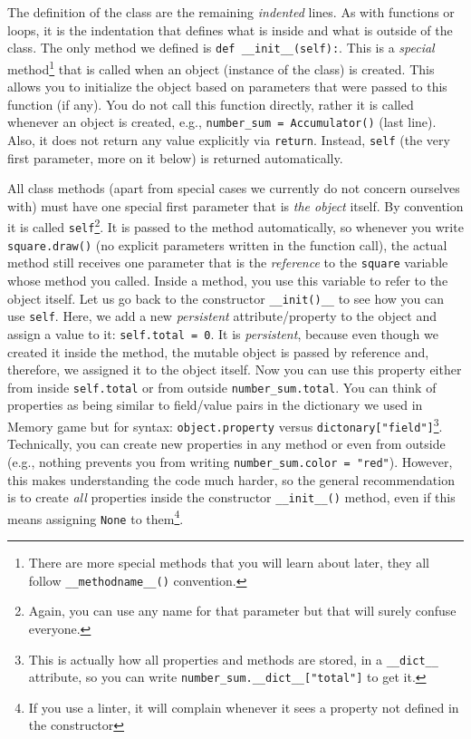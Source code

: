 \documentclass[
]{book}
\begin{document}
The definition of the class are the remaining \emph{indented} lines. As with functions or loops, it is the indentation that defines what is inside and what is outside of the class. The only method we defined is \texttt{def\ \_\_init\_\_(self):}. This is a \emph{special} method\footnote{There are more special methods that you will learn about later, they all follow \texttt{\_\_methodname\_\_()} convention.} that is called when an object (instance of the class) is created. This allows you to initialize the object based on parameters that were passed to this function (if any). You do not call this function directly, rather it is called whenever an object is created, e.g., \texttt{number\_sum\ =\ Accumulator()} (last line). Also, it does not return any value explicitly via \texttt{return}. Instead, \texttt{self} (the very first parameter, more on it below) is returned automatically.

All class methods (apart from special cases we currently do not concern ourselves with) must have one special first parameter that is \emph{the object} itself. By convention it is called \texttt{self}\footnote{Again, you can use any name for that parameter but that will surely confuse everyone.}. It is passed to the method automatically, so whenever you write \texttt{square.draw()} (no explicit parameters written in the function call), the actual method still receives one parameter that is the \emph{reference} to the \texttt{square} variable whose method you called. Inside a method, you use this variable to refer to the object itself.
Let us go back to the constructor \texttt{\_\_init()\_\_} to see how you can use \texttt{self}. Here, we add a new \emph{persistent} attribute/property to the object and assign a value to it: \texttt{self.total\ =\ 0}. It is \emph{persistent}, because even though we created it inside the method, the mutable object is passed by reference and, therefore, we assigned it to the object itself. Now you can use this property either from inside \texttt{self.total} or from outside \texttt{number\_sum.total}. You can think of properties as being similar to field/value pairs in the dictionary we used in Memory game but for syntax: \texttt{object.property} versus \texttt{dictonary{[}"field"{]}}\footnote{This is actually how all properties and methods are stored, in a \texttt{\_\_dict\_\_} attribute, so you can write \texttt{number\_sum.\_\_dict\_\_{[}"total"{]}} to get it.}. Technically, you can create new properties in any method or even from outside (e.g., nothing prevents you from writing \texttt{number\_sum.color\ =\ "red"}). However, this makes understanding the code much harder, so the general recommendation is to create \emph{all} properties inside the constructor \texttt{\_\_init\_\_()} method, even if this means assigning \texttt{None} to them\footnote{If you use a linter, it will complain whenever it sees a property not defined in the constructor}.
\end{document}
